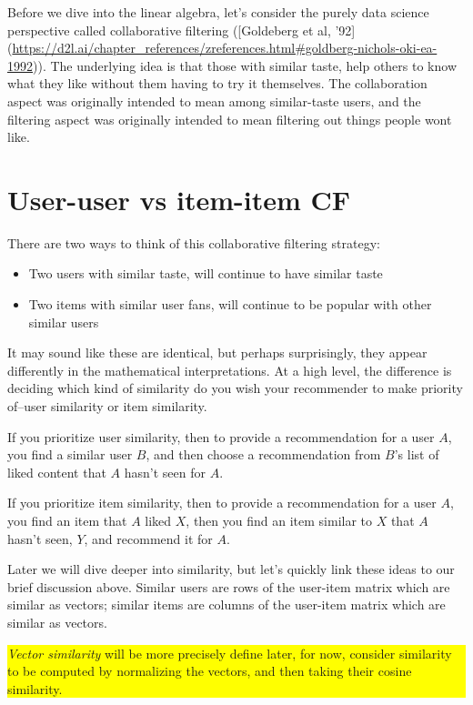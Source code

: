 Before we dive into the linear algebra, let's consider the purely data science perspective called collaborative filtering ([Goldeberg et al, '92](\url{https://d2l.ai/chapter_references/zreferences.html#goldberg-nichols-oki-ea-1992})). The underlying idea is that those with similar taste, help others to know what they like without them having to try it themselves. The collaboration aspect was originally intended to mean among similar-taste users, and the filtering aspect was originally intended to mean filtering out things people wont like.

\section{User-user vs item-item CF}

There are two ways to think of this collaborative filtering strategy:
\begin{itemize}
    \item Two users with similar taste, will continue to have similar taste
    \item Two items with similar user fans, will continue to be popular with other similar users
\end{itemize}

It may sound like these are identical, but perhaps surprisingly, they appear differently in the mathematical interpretations. At a high level, the difference is deciding which kind of similarity do you wish your recommender to make priority of–user similarity or item similarity.

If you prioritize user similarity, then to provide a recommendation for a user $A$, you find a similar user $B$, and then choose a recommendation from $B$'s list of liked content that $A$ hasn't seen  for $A$. 

If you prioritize item similarity, then to provide a recommendation for a user $A$, you find an item that $A$ liked $X$, then you find an item similar to $X$ that $A$ hasn't seen, $Y$, and recommend it for $A$.

Later we will dive deeper into similarity, but let's quickly link these ideas to our brief discussion above. Similar users are rows of the user-item matrix which are similar as vectors; similar items are columns of the user-item matrix which are similar as vectors.


\vspace{10pt}
\colorbox{yellow}{\parbox{\textwidth}{
 \emph{Vector similarity} will be more precisely define later, for now, consider similarity to be computed by normalizing the vectors, and then taking their cosine similarity.
}}
\vspace{10pt}


